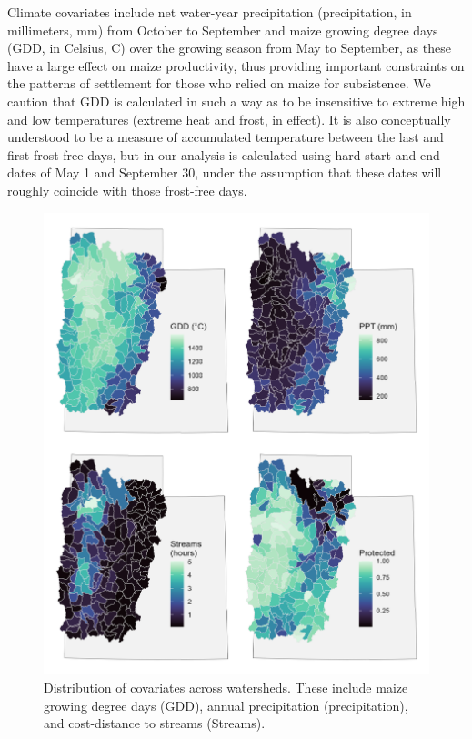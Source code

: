 \documentclass[
  number,
  preprint,
  3p]{elsarticle}
\begin{document}
Climate covariates include net water-year precipitation (precipitation,
in millimeters, mm) from October to September and maize growing degree
days (GDD, in Celsius, C) over the growing season from May to September,
as these have a large effect on maize productivity, thus providing
important constraints on the patterns of settlement for those who relied
on maize for subsistence. We caution that GDD is calculated in such a
way as to be insensitive to extreme high and low temperatures (extreme
heat and frost, in effect). It is also conceptually understood to be a
measure of accumulated temperature between the last and first frost-free
days, but in our analysis is calculated using hard start and end dates
of May 1 and September 30, under the assumption that these dates will
roughly coincide with those frost-free days.

\begin{figure}

{\centering \includegraphics[width=6in,height=\textheight]{../figures/covariates.png}

}

\caption{\label{fig-covariates}Distribution of covariates across
watersheds. These include maize growing degree days (GDD), annual
precipitation (precipitation), and cost-distance to streams (Streams).}

\end{figure}
\end{document}
